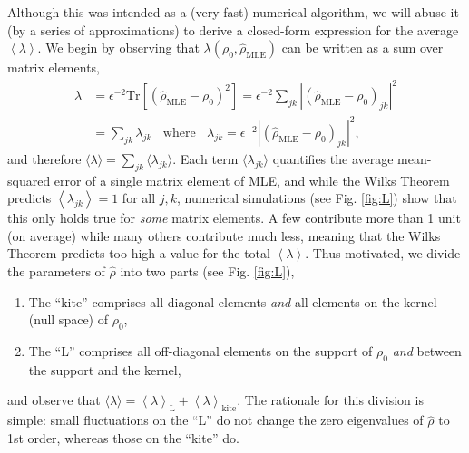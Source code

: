 \documentclass[aps,pra, twocolumn]{revtex4}
\newcommand{\expect}[1]{\ensuremath{\left\langle#1\right\rangle}}
\newcommand{\rhohat}{\hat{\rho}}
\newcommand{\rhoMLE}{\rhohat_{\scriptscriptstyle\mathrm{MLE}}}
\begin{document}
Although this was intended as a (very fast) numerical algorithm, we will abuse it (by a series of approximations) to derive a closed-form expression for the average $\expect{\lambda}$.  We begin by observing that $\lambda(\rho_{0}, \rhoMLE)$ can be written as a sum over matrix elements,
\begin{align}
\label{eq:llrserrors}
\nonumber \lambda &=\epsilon^{-2}\mathrm{Tr}[(\rhoMLE - \rho_{0})^{2}] = \epsilon^{-2}\sum_{jk}|(\rhoMLE- \rho_{0} )_{jk}|^{2}\\
&= \sum_{jk}\lambda_{jk}~~~~\text{where}~~~~\lambda_{jk} = \epsilon^{-2}|(\rhoMLE - \rho_{0} )_{jk} |^{2},
\end{align}
and therefore $\langle \lambda \rangle = \sum_{jk}\langle\lambda_{jk}\rangle$.  Each term $\langle \lambda_{jk}\rangle$ quantifies the average mean-squared error of a single matrix element of MLE, and while the Wilks Theorem predicts $\expect{\lambda_{jk}}=1$ for all $j,k$, numerical simulations (see Fig. \ref{fig:L}) show that this only holds true for \emph{some} matrix elements.  A few contribute more than 1 unit (on average) while many others contribute much less, meaning that the Wilks Theorem predicts too high a value for the total $\expect{\lambda}$.  Thus motivated, we divide the parameters of $\rhohat$ into two parts (see Fig. \ref{fig:L}),
\begin{enumerate}[noitemsep]
\item The ``kite'' comprises all diagonal elements \emph{and} all elements on the kernel (null space) of $\rho_0$,
\item The ``L'' comprises all off-diagonal elements on the support of $\rho_0$ \emph{and} between the support and the kernel,
\end{enumerate}
and observe that $\langle\lambda\rangle = \expect{\lambda}_{\mathrm{L}} + \expect{\lambda}_{\mathrm{kite}}$.  The rationale for this division is simple:  small fluctuations on the ``L'' do not change the zero eigenvalues of $\hat\rho$ to 1st order, whereas those on the ``kite'' do.    
\end{document}
